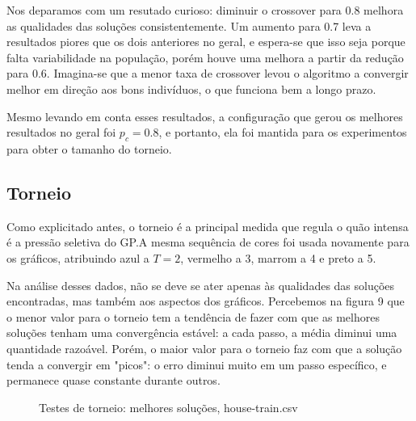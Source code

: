\documentclass[11pt]{article}
\begin{document}
Nos deparamos com um resutado curioso: diminuir o crossover para 0.8 melhora as qualidades das soluções consistentemente. Um aumento para 0.7 leva a resultados piores que os dois anteriores no geral, e espera-se que isso seja porque falta variabilidade na população, porém houve uma melhora a partir da redução para 0.6. Imagina-se que a menor taxa de crossover levou o algoritmo a convergir melhor em direção aos bons indivíduos, o que funciona bem a longo prazo.

Mesmo levando em conta esses resultados, a configuração que gerou os melhores resultados no geral foi $p_c = 0.8$, e portanto, ela foi mantida para os experimentos para obter o tamanho do torneio.

\subsection{Torneio}

Como explicitado antes, o torneio é a principal medida que regula o quão intensa é a pressão seletiva do GP.A mesma sequência de cores foi usada novamente para os gráficos, atribuindo azul a $T = 2$, vermelho a 3, marrom a 4 e preto a 5.

Na análise desses dados, não se deve se ater apenas às qualidades das soluções encontradas, mas também aos aspectos dos gráficos. Percebemos na figura 9 que o menor valor para o torneio tem a tendência de fazer com que as melhores soluções tenham uma convergência estável: a cada passo, a média diminui uma quantidade razoável. Porém, o maior valor para o torneio faz com que a solução tenda a convergir em "picos": o erro diminui muito em um passo específico, e permanece quase constante durante outros.

\begin{figure}[!ht]
	\centering
    \caption{Testes de torneio: melhores soluções, house-train.csv}
    \label{fig:data}
\end{figure}
\end{document}

